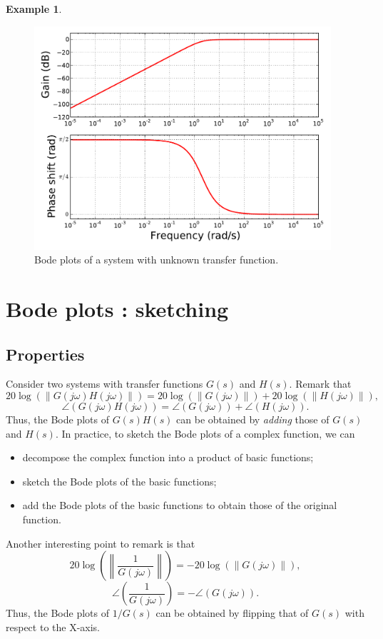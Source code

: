 \documentclass[a4paper,11pt]{report}
\theoremstyle{definition}
\newtheorem{mdexample}{Example}
\newenvironment{example}%
  {\vspace{0.1cm}\begin{mdframed}[backgroundcolor=lightgray]\begin{mdexample}}%
  {\end{mdexample}\end{mdframed}\vspace{0.1cm}}
\begin{document}
\begin{example}
  \begin{figure}[H]
    \centering
    \includegraphics[width=11cm]{fig/exbode.pdf}
    \caption{Bode plots of a system with unknown transfer function.}
    \label{fig:exbode}
  \end{figure}

\end{example}

\section{Bode plots : sketching}
\label{sec:bode-sketch}

\subsection{Properties}

Consider two systems with transfer functions $G(s)$ and $H(s)$. Remark
that
\[
20\log(\|G(j\omega)H(j\omega)\|) = 20\log(\|G(j\omega)\|) + 20 \log(\|H(j\omega)\|),
\]
\[
\angle(G(j\omega)H(j\omega)) = \angle(G(j\omega)) + \angle(H(j\omega)).
\]
Thus, the Bode plots of $G(s)H(s)$ can be obtained by \emph{adding}
those of $G(s)$ and $H(s)$. In practice, to sketch the Bode plots of a
complex function, we can
\begin{itemize}
\item decompose the complex function into a product of basic functions;
\item sketch the Bode plots of the basic functions;
\item add the Bode plots of the basic functions to obtain those of the
  original function.
\end{itemize}

Another interesting point to remark is that
\[
20\log\left(\left\|\frac{1}{G(j\omega)}\right\|\right) = -20\log(\|G(j\omega)\|),
\]
\[
\angle\left(\frac{1}{G(j\omega)}\right) = -\angle(G(j\omega)).
\]
Thus, the Bode plots of $1/G(s)$ can be obtained by flipping that of
$G(s)$ with respect to the X-axis.
\end{document}

